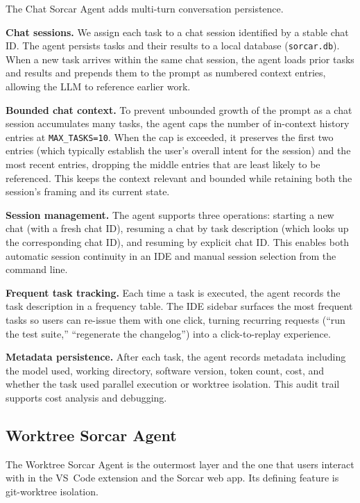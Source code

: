 \documentclass{article}
\begin{document}
The Chat Sorcar Agent adds multi-turn conversation persistence.

\textbf{Chat sessions.}  We assign each task to a chat session identified by a stable chat ID.  The agent persists tasks and their results to a local database (\texttt{sorcar.db}).  When a new task arrives within the same chat session, the agent loads prior tasks and results and prepends them to the prompt as numbered context entries, allowing the LLM to reference earlier work.

\textbf{Bounded chat context.}  To prevent unbounded growth of the prompt as a chat session accumulates many tasks, the agent caps the number of in-context history entries at \texttt{MAX\_TASKS=10}.  When the cap is exceeded, it preserves the first two entries (which typically establish the user's overall intent for the session) and the most recent entries, dropping the middle entries that are least likely to be referenced.  This keeps the context relevant and bounded while retaining both the session's framing and its current state.

\textbf{Session management.}  The agent supports three operations: starting a new chat (with a fresh chat ID), resuming a chat by task description (which looks up the corresponding chat ID), and resuming by explicit chat ID.  This enables both automatic session continuity in an IDE and manual session selection from the command line.

\textbf{Frequent task tracking.}  Each time a task is executed, the agent records the task description in a frequency table.  The IDE sidebar surfaces the most frequent tasks so users can re-issue them with one click, turning recurring requests (``run the test suite,'' ``regenerate the changelog'') into a click-to-replay experience.

\textbf{Metadata persistence.}  After each task, the agent records metadata including the model used, working directory, software version, token count, cost, and whether the task used parallel execution or worktree isolation.  This audit trail supports cost analysis and debugging.

\subsection{Worktree Sorcar Agent}
\label{sec:worktree-agent}

The Worktree Sorcar Agent is the outermost layer and the one that users interact with in the VS~Code extension and the Sorcar web app.  Its defining feature is git-worktree isolation.
\end{document}
